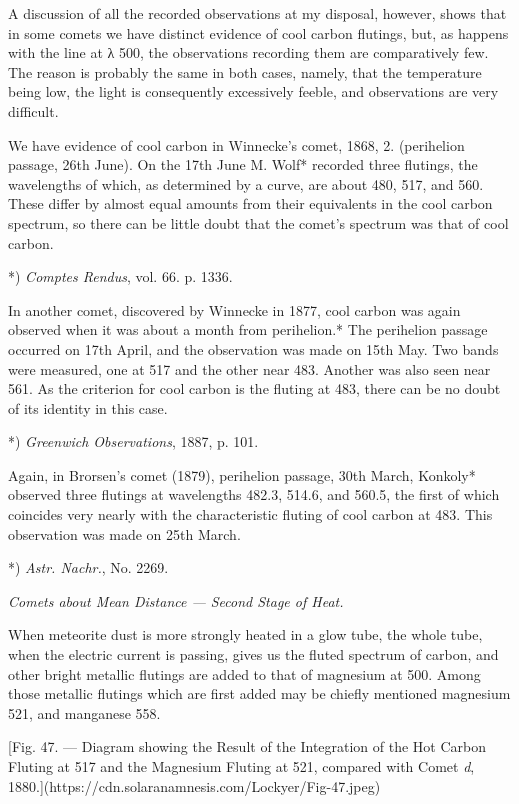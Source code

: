 \documentclass[a4paper, 12pt, oneside, polutonikogreek, english]{article}
\begin{document}
A discussion of all the recorded observations at my disposal, however, shows that in some comets we have distinct evidence of cool carbon flutings, but, as happens with the line at λ 500, the observations recording them are comparatively few. The reason is probably the same in both cases, namely, that the temperature being low, the light is consequently excessively feeble, and observations are very difficult.

We have evidence of cool carbon in Winnecke's comet, 1868, 2. (perihelion passage, 26th June). On the 17th June M. Wolf* recorded three flutings, the wavelengths of which, as determined by a curve, are about 480, 517, and 560. These differ by almost equal amounts from their equivalents in the cool carbon spectrum, so there can be little doubt that the comet's spectrum was that of cool carbon.

*) \emph{Comptes Rendus}, vol. 66. p. 1336.

In another comet, discovered by Winnecke in 1877, cool carbon was again observed when it was about a month from perihelion.* The perihelion passage occurred on 17th April, and the observation was made on 15th May. Two bands were measured, one at 517 and the other near 483. Another was also seen near 561. As the criterion for cool carbon is the fluting at 483, there can be no doubt of its identity in this case.

*) \emph{Greenwich Observations}, 1887, p. 101.

Again, in Brorsen's comet (1879), perihelion passage, 30th March, Konkoly* observed three flutings at wavelengths 482.3, 514.6, and 560.5, the first of which coincides very nearly with the characteristic fluting of cool carbon at 483. This observation was made on 25th March.

*) \emph{Astr. Nachr.}, No. 2269.

\emph{Comets about Mean Distance --- Second Stage of Heat.}

When meteorite dust is more strongly heated in a glow tube, the whole tube, when the electric current is passing, gives us the fluted spectrum of carbon, and other bright metallic flutings are added to that of magnesium at 500. Among those metallic flutings which are first added may be chiefly mentioned magnesium 521, and manganese 558.

[Fig. 47. --- Diagram showing the Result of the Integration of the Hot Carbon Fluting at 517 and the Magnesium Fluting at 521, compared with Comet \emph{d}, 1880.](https://cdn.solaranamnesis.com/Lockyer/Fig-47.jpeg)
\end{document}
